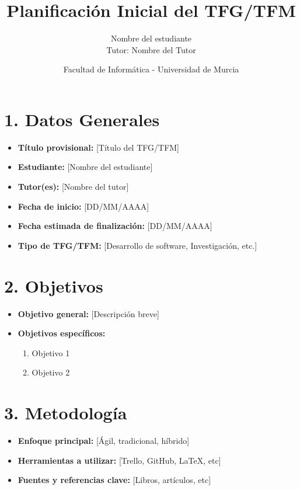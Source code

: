 \documentclass[12pt, a4paper]{article}
\title{\textbf{Planificación Inicial del TFG/TFM}}
\author{Nombre del estudiante \\ Tutor: Nombre del Tutor}
\date{Facultad de Informática - Universidad de Murcia}
\begin{document}
\maketitle

\section*{1. Datos Generales}
\begin{itemize}
    \item \textbf{Título provisional:} [Título del TFG/TFM]
    \item \textbf{Estudiante:} [Nombre del estudiante]
    \item \textbf{Tutor(es):} [Nombre del tutor]
    \item \textbf{Fecha de inicio:} [DD/MM/AAAA]
    \item \textbf{Fecha estimada de finalización:} [DD/MM/AAAA]
    \item \textbf{Tipo de TFG/TFM:} [Desarrollo de software, Investigación, etc.]
\end{itemize}

\section*{2. Objetivos}
\begin{itemize}
    \item \textbf{Objetivo general:} [Descripción breve]
    \item \textbf{Objetivos específicos:}
    \begin{enumerate}
        \item Objetivo 1
        \item Objetivo 2
    \end{enumerate}
\end{itemize}

\section*{3. Metodología}
\begin{itemize}
    \item \textbf{Enfoque principal:} [Ágil, tradicional, híbrido]
    \item \textbf{Herramientas a utilizar:} [Trello, GitHub, LaTeX, etc]
    \item \textbf{Fuentes y referencias clave:} [Libros, artículos, etc]
\end{itemize}
\end{document}
